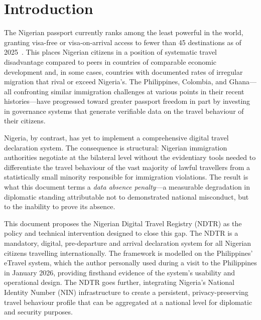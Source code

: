 \documentclass[11pt]{article}
\begin{document}
\vspace{10pt}

\section{Introduction}

The Nigerian passport currently ranks among the least powerful in the world,
granting visa-free or visa-on-arrival access to fewer than 45 destinations
as of 2025~\cite{henley2025}. This places Nigerian citizens in a position of
systematic travel disadvantage compared to peers in countries of comparable
economic development and, in some cases, countries with documented rates of
irregular migration that rival or exceed Nigeria's. The Philippines,
Colombia, and Ghana---all confronting similar immigration challenges at
various points in their recent histories---have progressed toward greater
passport freedom in part by investing in governance systems that generate
verifiable data on the travel behaviour of their citizens.

Nigeria, by contrast, has yet to implement a comprehensive digital travel
declaration system. The consequence is structural: Nigerian immigration
authorities negotiate at the bilateral level without the evidentiary tools
needed to differentiate the travel behaviour of the vast majority of
lawful travellers from a statistically small minority responsible for
immigration violations.
The result is what this document terms a \textit{data absence penalty}---a
measurable degradation in diplomatic standing attributable not to
demonstrated national misconduct, but to the inability to prove its
absence.

This document proposes the Nigerian Digital Travel Registry (NDTR) as the
policy and technical intervention designed to close this gap. The NDTR is
a mandatory, digital, pre-departure and arrival declaration system for all
Nigerian citizens travelling internationally. The framework is modelled on
the Philippines' eTravel system, which the author personally used during
a visit to the Philippines in January 2026, providing firsthand evidence of
the system's usability and operational design. The NDTR goes further, integrating
Nigeria's National Identity Number (NIN) infrastructure to create a persistent,
privacy-preserving travel behaviour profile that can be aggregated at a national
level for diplomatic and security purposes.
\end{document}
